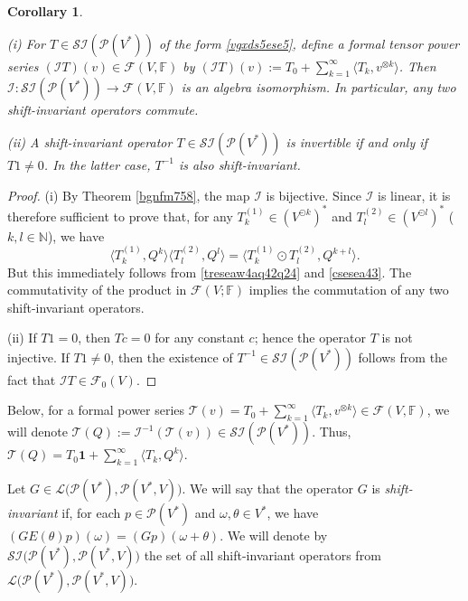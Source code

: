 \documentclass[12pt]{article}
\newtheorem{corollary}[theorem]{Corollary}
\theoremstyle{remark}
\theoremstyle{remark}
\theoremstyle{remark}
\begin{document}
\begin{corollary}\label{567ty7} 
  

{\rm (i)\/} For  $T \in \mathcal {SI}(\mathcal P  (V^*))$ of the form \eqref{vgxds5ese5}, define a formal tensor power series $(\mathcal IT)(v)\in \mathcal F(V,\mathbb F)$ by
$(\mathcal IT)(v):=T_0+\sum_{k=1}^\infty \langle T_k,v^{\otimes k}\rangle$.
Then $\mathcal I:\mathcal{SI}(\mathcal P  (V^*))\to \mathcal F(V,\mathbb F)$
 is an algebra isomorphism. In particular, any two shift-invariant operators commute. 

{\rm (ii)\/} A shift-invariant operator $T\in \mathcal{SI}(\mathcal P    (V^*))$  is invertible if and only if $T1\ne0$. In the latter case, $T^{-1}$ is also shift-invariant. 
\end{corollary}

\begin{proof} (i) By Theorem \ref{bgnfm758}, the map $\mathcal I$ is bijective. Since $\mathcal I$ is linear, it is therefore sufficient to prove that, for any $T^{(1)}_k\in (V^{\odot  k})^*$ and  $T^{(2)}_l\in (V^{\odot  l})^*$ ($k,l\in\mathbb N$), we have
$$\langle T^{(1)}_k,Q^{k}\rangle \langle T^{(2)}_l,Q^{l}\rangle 
=\langle T^{(1)}_k\odot T^{(2)}_l,Q^{k+l}\rangle. $$ 
But this immediately follows from \eqref{treseaw4aq42q24} and \eqref{csesea43}. The commutativity of the product in $\mathcal F(V;\mathbb F)$ implies the commutation of any two shift-invariant operators.

(ii) If $T1=0$, then $Tc=0$ for any constant $c$; hence the operator $T$ is not injective. If $T1\ne0$, then the existence of $T^{-1}\in  \mathcal{SI}(\mathcal P    (V^*)) $ follows from the fact that $\mathcal IT\in\mathcal F_0(V)$.
\end{proof}

  Below, for a formal power series $\mathcal T (v)=T_0+\sum_{k=1}^\infty \langle T_k,v^{\otimes k}\rangle\in\mathcal F(V,\mathbb F)$, we will denote $\mathcal T(Q):=\mathcal I^{-1}(\mathcal T(v))\in \mathcal{SI}(\mathcal P  (V^*))$. Thus,
  $\mathcal T(Q)=T_0\mathbf 1+\sum_{k=1}^\infty\langle T_k,Q^k\rangle$.
  
  

Let $G\in\mathcal L\big(\mathcal P(V^*),\mathcal P(V^*,V)\big)$. We will say that the operator $G$ is {\it shift-invariant\/} if, for each $p\in\mathcal P(V^*)$ and $\omega,\theta\in V^*$, we have $(GE(\theta)p)(\omega)=(Gp)(\omega+\theta)$.  We will denote by $ \mathcal{SI}\big(\mathcal P    (V^*),\mathcal P(V^*,V)\big)$ the set of all shift-invariant operators from $\mathcal L\big(\mathcal P(V^*),\mathcal P(V^*,V)\big)$. 
\end{document}
